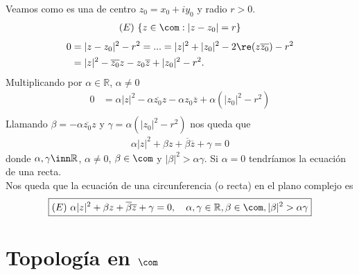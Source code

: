 Veamos como es una  de centro $z_0 = x_0 +iy_0$ y radio $r > 0$.
\begin{align*}
 (E) \ \{ z \in \com : |z - z_0| = r \}  
\end{align*}
\begin{align*}
    0 &= |z-z_0|^2 - r^2 = ... = |z|^2 + |z_0|^2 - 2\re(z\overline{z_0}) - r^2 \\
    &= |z|^2 - \overline{z_0}z - z_0\overline{z} + |z_0|^2 - r^2.
\end{align*}
Multiplicando por $\alpha \in \mathbb{R}$, $\alpha \not = 0$
\begin{align*}
    0 &= \alpha |z|^2 - \alpha \overline{z_0}z - \alpha z_0\overline{z} + \alpha (|z_0|^2 - r^2) \\
\end{align*}
Llamando $\beta = -\alpha\overline{z_0}z$ y $\gamma =  \alpha (|z_0|^2 - r^2)$ nos queda que
\begin{align*}
    \alpha|z|^2 + \beta z + \overline{\beta} \overline{z} + \gamma = 0
\end{align*}
donde $\alpha, \gamma \inn \mathbb{R}$, $\alpha \not = 0$, $\beta \in \com$ y $|\beta|^2 > \alpha \gamma$. Si $\alpha = 0$ tendríamos la ecuación de una recta.
\\
\newline
Nos queda que la ecuación de una circunferencia (o recta) en el plano complejo es
\begin{align*}
\boxed{
    (E) \ \alpha|z|^2 + \beta z + \overline{\beta} \overline{z} + \gamma = 0, \ \ \ \alpha, \gamma \in \mathbb{R}, \beta \in \com, |\beta|^2 > \alpha \gamma
    }
\end{align*}

\section{Topología en $\com$}

